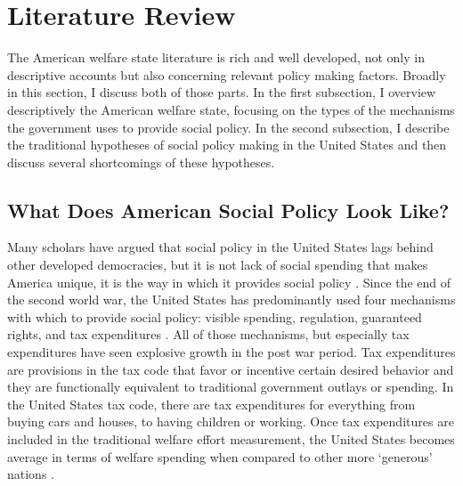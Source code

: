 \documentclass[12pt]{article}
\begin{document}

\section{Literature Review}

The American welfare state literature is rich and well developed, not only in descriptive accounts but also concerning relevant policy making factors. Broadly in this section, I discuss both of those parts. In the first subsection, I overview descriptively the American welfare state, focusing on the types of the mechanisms the government uses to provide social policy. In the second subsection, I describe the traditional hypotheses of social policy making in the United States and then discuss several shortcomings of these hypotheses. 

\subsection{What Does American Social Policy Look Like?}
Many scholars have argued that social policy in the United States lags behind other developed democracies, but it is not lack of social spending that makes America unique, it is the way in which it provides social policy \citep{hacker2002}. Since the end of the second world war, the United States has predominantly used four mechanisms with which to provide social policy: visible spending, regulation, guaranteed rights, and tax expenditures \citep{pierson2007}. All of those mechanisms, but especially tax expenditures have seen explosive growth in the post war period. Tax expenditures are provisions in the tax code that favor or incentive  certain desired behavior and they are functionally equivalent to traditional government outlays or spending. In the United States tax code, there are tax expenditures for everything from buying cars and houses, to having children or working. Once tax expenditures are included in the traditional welfare effort measurement, the United States becomes average in terms of welfare spending when compared to other more `generous' nations \citep[Ch. 1]{howard2008}.
\end{document}
